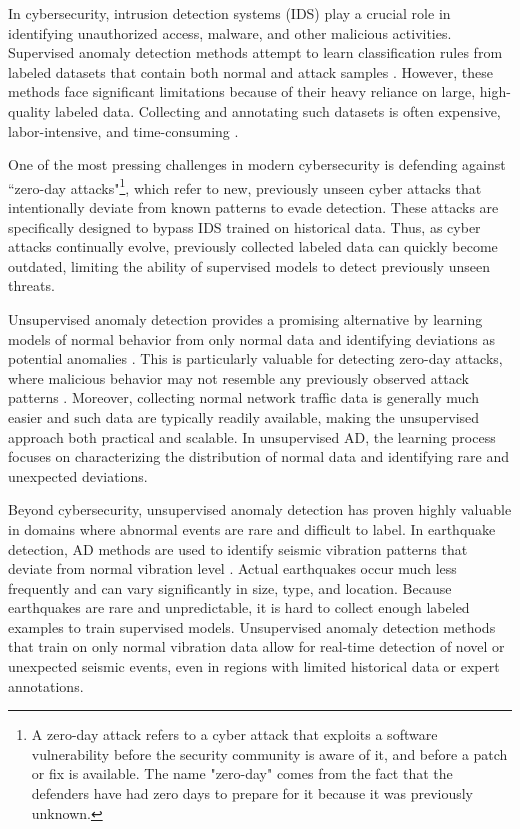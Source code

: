 \documentclass{article}
\begin{document}
In cybersecurity, intrusion detection systems (IDS) play a crucial role in identifying unauthorized access, malware, and other malicious activities. Supervised anomaly detection methods attempt to learn classification rules from labeled datasets that contain both normal and attack samples \citep{laskov2005learning, ring2019survey}. However, these methods face significant limitations because of their heavy reliance on large, high-quality labeled data. Collecting and annotating such datasets is often expensive, labor-intensive, and time-consuming \citep{chandola2009anomaly}. 

One of the most pressing challenges in modern cybersecurity is defending against ``zero-day attacks"\footnote{A zero-day attack refers to a cyber attack that exploits a software vulnerability before the security community is aware of it, and before a patch or fix is available. The name "zero-day" comes from the fact that the defenders have had zero days to prepare for it because it was previously unknown.}, which refer to new, previously unseen cyber attacks that intentionally deviate from known patterns to evade detection. These attacks are specifically designed to bypass IDS trained on historical data. Thus, as cyber attacks continually evolve, previously collected labeled data can quickly become outdated, limiting the ability of supervised models to detect previously unseen threats.

Unsupervised anomaly detection provides a promising alternative by learning models of normal behavior from only normal data and identifying deviations as potential anomalies \citep{chandola2009anomaly, ahmed2016survey}. This is particularly valuable for detecting zero-day attacks, where malicious behavior may not resemble any previously observed attack patterns \citep{kim2014novel}. Moreover, collecting normal network traffic data is generally much easier and such data are typically readily available, making the unsupervised approach both practical and scalable. In unsupervised AD, the learning process focuses on characterizing the distribution of normal data and identifying rare and unexpected deviations.

Beyond cybersecurity, unsupervised anomaly detection has proven highly valuable in domains where abnormal events are rare and difficult to label. In earthquake detection, AD methods are used to identify seismic vibration patterns that deviate from normal vibration level \citep{perol2018convolutional, seo2024unsupervised}. 
Actual earthquakes occur much less frequently and can vary significantly in size, type, and location. Because earthquakes are rare and unpredictable, it is hard to collect enough labeled examples to train supervised models. Unsupervised anomaly detection methods that train on only normal vibration data allow for real-time detection of novel or unexpected seismic events, even in regions with limited historical data or expert annotations.
\end{document}
